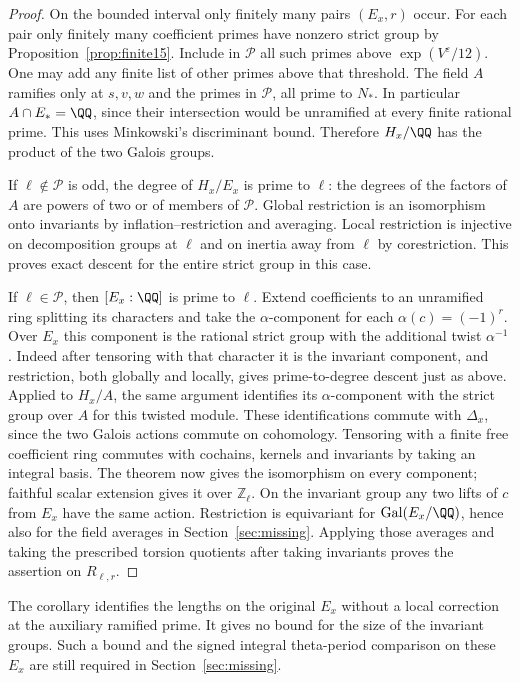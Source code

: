 \documentclass[a4paper,11pt]{article}
\theoremstyle{definition}
\theoremstyle{remark}
\newcommand{\ZZ}{\mathbb Z}\newcommand{\ord}{\operatorname{ord}}
\numberwithin{equation}{section}
\begin{document}
\begin{proof}
On the bounded interval only finitely many pairs \((E_x,r)\)
occur. For each pair only finitely many coefficient primes
have nonzero strict group by Proposition~\ref{prop:finite15}.
Include in \(\mathcal P\) all such primes above
\(\exp(V^\varepsilon/12)\). One may add any finite list of
other primes above that threshold. The field \(A\) ramifies only
at \(s,v,w\) and the primes in \(\mathcal P\), all prime to \(N_*\).
In particular \(A\cap E_*=\QQ\), since their intersection
would be unramified at every finite rational prime. This uses
Minkowski's discriminant bound. Therefore \(H_x/\QQ\) has the
product of the two Galois groups.

If \(\ell\notin\mathcal P\) is odd, the degree of \(H_x/E_x\)
is prime to \(\ell\): the degrees of the factors of \(A\) are
powers of two or of members of \(\mathcal P\). Global restriction
is an isomorphism onto invariants by inflation--restriction
and averaging. Local restriction is injective on decomposition
groups at \(\ell\) and on inertia away from \(\ell\) by
corestriction. This proves exact descent for the entire strict
group in this case.

If \(\ell\in\mathcal P\), then \([E_x:\QQ]\) is prime to
\(\ell\). Extend coefficients to an unramified ring splitting
its characters and take the \(\alpha\)-component for each
\(\alpha(c)=(-1)^r\). Over \(E_x\) this component is the
rational strict group with the additional twist \(\alpha^{-1}\).
Indeed after tensoring with that character it is the invariant
component, and restriction, both globally and locally, gives
prime-to-degree descent just as above. Applied to \(H_x/A\),
the same argument identifies its \(\alpha\)-component with
the strict group over \(A\) for this twisted module. These
identifications commute with \(\Delta_x\), since the two
Galois actions commute on cohomology. Tensoring with a finite
free coefficient ring commutes with cochains, kernels and
invariants by taking an integral basis. The theorem now gives
the isomorphism on every component; faithful scalar extension
gives it over \(\ZZ_\ell\). On the invariant group any two
lifts of \(c\) from \(E_x\) have the same action. Restriction
is equivariant for \(\operatorname{Gal}(E_x/\QQ)\), hence also
for the field averages in Section~\ref{sec:missing}. Applying
those averages and taking the prescribed torsion quotients
after taking invariants proves the assertion on \(R_{\ell,r}\).
\end{proof}

The corollary identifies the lengths on the original \(E_x\)
without a local correction at the auxiliary ramified prime.
It gives no bound for the size of the invariant groups. Such
a bound and the signed integral theta-period comparison on
these \(E_x\) are still required in Section~\ref{sec:missing}.
\end{document}
